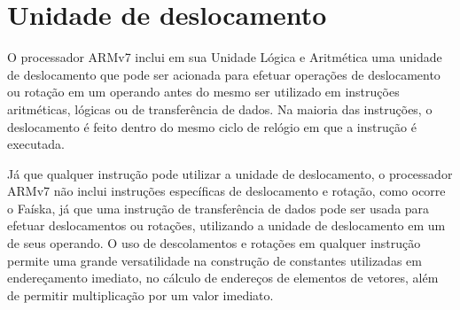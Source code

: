 \section{Unidade de deslocamento}

O processador ARMv7 inclui em sua Unidade Lógica e Aritmética uma unidade de deslocamento que pode ser acionada para efetuar operações de deslocamento ou rotação em um operando antes do mesmo ser utilizado em instruções aritméticas, lógicas ou de transferência de dados. Na maioria das instruções, o deslocamento é feito dentro do mesmo ciclo de relógio em que a instrução é executada. 

Já que qualquer instrução pode utilizar a unidade de deslocamento, o processador ARMv7 não inclui instruções específicas de deslocamento e rotação, como ocorre o Faíska, já que uma instrução de transferência de dados pode ser usada para efetuar deslocamentos ou rotações, utilizando a unidade de deslocamento em um de seus operando. 
O uso de descolamentos e rotações em qualquer instrução permite uma grande versatilidade na construção de constantes utilizadas em endereçamento imediato, no cálculo de endereços de elementos de vetores, além de permitir multiplicação por um valor imediato.